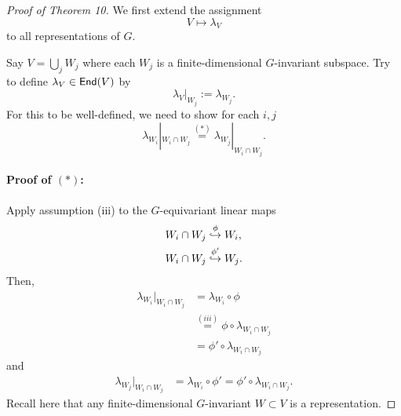 \begin{proof}[Proof of Theorem 10]
We first extend the assignment
\[ V \mapsto \lambda_V \]
to all representations of $G$.

Say $V = \bigcup_{j} W_j$ where each $W_j$ is a finite-dimensional $G$-invariant subspace. Try to define $\lambda_V \in  \textsf{End}(V)$ by 
\[ \lambda_V|_{W_j} := \lambda_{W_j}. \]
For this to be well-defined, we need to show for each $i,j$
\[ \lambda_{W_i}|_{W_i \cap W_j} \overset{(*)}{=} \lambda_{W_j}|_{W_i \cap W_j}. \]

\paragraph{Proof of $(*)$:} Apply assumption (iii) to the $G$-equivariant linear maps
\begin{align*}
W_i \cap W_j &\overset{\phi}{\hookrightarrow} W_i,\\
W_i \cap W_j &\overset{\phi'}{\hookrightarrow} W_j.\\
\end{align*}
Then,
\begin{align*}
\lambda_{W_i} |_{W_i \cap W_j} & = \lambda_{W_i} \circ \phi \\
&\overset{(iii)}{=} \phi\circ \lambda_{W_i \cap W_j} \\
&= \phi'\circ \lambda_{W_i \cap W_j}
\end{align*}
and
\begin{align*}
\lambda_{W_j} |_{W_i \cap W_j} & = \lambda_{W_i} \circ \phi' =  \phi'\circ \lambda_{W_i \cap W_j}.
\end{align*}
Recall here that any finite-dimensional $G$-invariant $W\subset V$ is a representation.
\end{proof}

